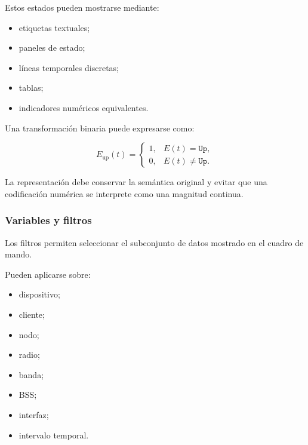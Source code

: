 Estos estados pueden mostrarse mediante:

\begin{itemize}
    \item etiquetas textuales;

    \item paneles de estado;

    \item líneas temporales discretas;

    \item tablas;

    \item indicadores numéricos equivalentes.
\end{itemize}

Una transformación binaria puede expresarse como:

\[
    E_{\mathrm{up}}(t)
    =
    \begin{cases}
        1, & E(t)=\texttt{Up},\\
        0, & E(t)\neq\texttt{Up}.
    \end{cases}
\]

La representación debe conservar la semántica original y evitar que una
codificación numérica se interprete como una magnitud continua.


\subsubsection*{Variables y filtros}

Los filtros permiten seleccionar el subconjunto de datos mostrado en el
cuadro de mando.

Pueden aplicarse sobre:

\begin{itemize}
    \item dispositivo;

    \item cliente;

    \item nodo;

    \item radio;

    \item banda;

    \item BSS;

    \item interfaz;

    \item intervalo temporal.
\end{itemize}

